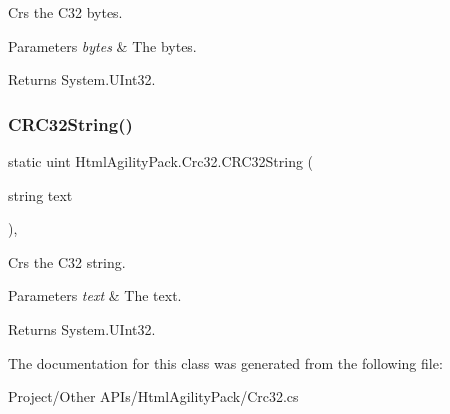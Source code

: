 Crs the C32 bytes. 


\begin{DoxyParams}{Parameters}
{\em bytes} & The bytes.\\
\hline
\end{DoxyParams}
\begin{DoxyReturn}{Returns}
System.\+U\+Int32.
\end{DoxyReturn}
\mbox{\label{class_html_agility_pack_1_1_crc32_af5d22a9bd82dfb2b9799f43e5a71be78}} 
\subsubsection{\texorpdfstring{C\+R\+C32\+String()}{CRC32String()}}
{\footnotesize\ttfamily static uint Html\+Agility\+Pack.\+Crc32.\+C\+R\+C32\+String (\begin{DoxyParamCaption}\item[{string}]{text }\end{DoxyParamCaption})\hspace{0.3cm}{\ttfamily [inline]}, {\ttfamily [static]}}



Crs the C32 string. 


\begin{DoxyParams}{Parameters}
{\em text} & The text.\\
\hline
\end{DoxyParams}
\begin{DoxyReturn}{Returns}
System.\+U\+Int32.
\end{DoxyReturn}


The documentation for this class was generated from the following file\+:\begin{DoxyCompactItemize}
\item 
Project/\+Other A\+P\+Is/\+Html\+Agility\+Pack/Crc32.\+cs\end{DoxyCompactItemize}
